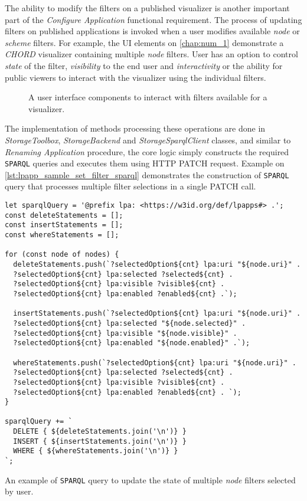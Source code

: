 The ability to modify the filters on a published visualizer is another important part of the \textit{Configure Application} functional requirement. The process of updating filters on published applications is invoked when a user modifies available \textit{node} or \textit{scheme} filters. For example, the UI elements on \autoref{chap:num_1} demonstrate a \textit{CHORD} visualizer containing multiple \textit{node} filters. User has an option to control \textit{state} of the filter, \textit{visibility} to the end user and \textit{interactivity} or the ability for public viewers to interact with the visualizer using the individual filters. 

\begin{figure}[h]
\centering
{}
\caption{A user interface components to interact with filters available for a visualizer.}
\label{fig:lpa_filters_interactions}
\end{figure}


The implementation of methods processing these operations are done in \textit{StorageToolbox}, \textit{StorageBackend} and \textit{StorageSparqlClient} classes, and similar to \textit{Renaming Application} procedure, the core logic simply constructs the required \texttt{SPARQL} queries and executes them using HTTP PATCH request. Example on \autoref{lst:lpapp_sample_set_filter_sparql} demonstrates the construction of \texttt{SPARQL} query that processes multiple filter selections in a single PATCH call.  

\begin{listing}[H]    
\begin{verbatim}
let sparqlQuery = '@prefix lpa: <https://w3id.org/def/lpapps#> .';
const deleteStatements = [];
const insertStatements = [];
const whereStatements = [];

for (const node of nodes) {
  deleteStatements.push(`?selectedOption${cnt} lpa:uri "${node.uri}" .
  ?selectedOption${cnt} lpa:selected ?selected${cnt} .
  ?selectedOption${cnt} lpa:visible ?visible${cnt} .
  ?selectedOption${cnt} lpa:enabled ?enabled${cnt} .`);

  insertStatements.push(`?selectedOption${cnt} lpa:uri "${node.uri}" .
  ?selectedOption${cnt} lpa:selected "${node.selected}" .
  ?selectedOption${cnt} lpa:visible "${node.visible}" .
  ?selectedOption${cnt} lpa:enabled "${node.enabled}" .`);

  whereStatements.push(`?selectedOption${cnt} lpa:uri "${node.uri}" .
  ?selectedOption${cnt} lpa:selected ?selected${cnt} .
  ?selectedOption${cnt} lpa:visible ?visible${cnt} .
  ?selectedOption${cnt} lpa:enabled ?enabled${cnt} . `);
}

sparqlQuery += `
  DELETE { ${deleteStatements.join('\n')} }
  INSERT { ${insertStatements.join('\n')} }
  WHERE { ${whereStatements.join('\n')} }
`;
\end{verbatim}
\caption{An example of \texttt{SPARQL} query to update the state of multiple \textit{node} filters selected by user.} 
\label{lst:lpapp_sample_set_filter_sparql}
\end{listing}

